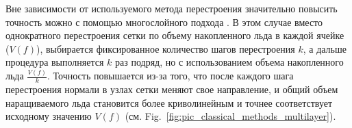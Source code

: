 Вне зависимости от используемого метода перестроения значительно повысить точность можно с помощью многослойного подхода \cite{BourgaultCote}.
В этом случае вместо однократного перестроения сетки по объему накопленного льда в каждой ячейке ($V(f)$), выбирается фиксированное количество шагов перестроения $k$, а дальше процедура выполняется $k$ раз подряд, но с использованием объема накопленного льда $\frac{V(f)}{k}$.
Точность повышается из-за того, что после каждого шага перестроения нормали в узлах сетки меняют свое направление, и общий объем наращиваемого льда становится более криволинейным и точнее соответствует исходному значению $V(f)$ (см. Fig.~\ref{fig:pic_classical_methods_multilayer}).
